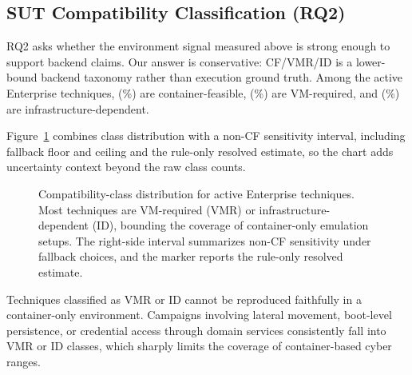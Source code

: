 \documentclass[sigconf]{acmart}
\begin{document}
\subsection{SUT Compatibility Classification (RQ2)}

RQ2 asks whether the environment signal measured above is strong enough to support backend claims. Our answer is conservative: CF/VMR/ID is a lower-bound backend taxonomy rather than execution ground truth. Among the \enterpriseplatformcount{} active Enterprise techniques, \compatibilitycontainerfeasiblecount{} (\compatibilitycontainerfeasiblepercentage\%) are container-feasible, \compatibilityvmrequiredcount{} (\compatibilityvmrequiredpercentage\%) are VM-required, and \compatibilityinfrastructuredependentcount{} (\compatibilityinfrastructuredependentpercentage\%) are infrastructure-dependent.

Figure~\ref{fig:compatibility_distribution} combines class distribution with a non-CF sensitivity interval, including fallback floor and ceiling and the rule-only resolved estimate, so the chart adds uncertainty context beyond the raw class counts.

\begin{figure}[!tb]
\centering
\resizebox{\columnwidth}{!}{}
\caption{\label{fig:compatibility_distribution}Compatibility-class distribution for active Enterprise techniques. Most techniques are VM-required (VMR) or infrastructure-dependent (ID), bounding the coverage of container-only emulation setups. The right-side interval summarizes non-CF sensitivity under fallback choices, and the marker reports the rule-only resolved estimate.}
\end{figure}

Techniques classified as VMR or ID cannot be reproduced faithfully in a container-only environment. Campaigns involving lateral movement, boot-level persistence, or credential access through domain services consistently fall into VMR or ID classes, which sharply limits the coverage of container-based cyber ranges.
\end{document}
